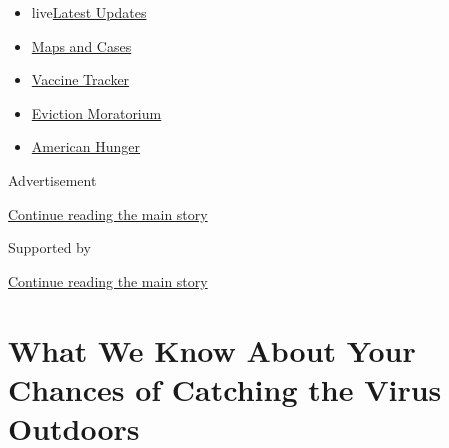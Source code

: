 \begin{itemize}
\tightlist
\item
  live\href{https://www.nytimes3xbfgragh.onion/2020/09/05/world/coronavirus-covid.html?name=styln-coronavirus-national\&region=TOP_BANNER\&block=storyline_menu_recirc\&action=click\&pgtype=Article\&impression_id=38bfd400-efbb-11ea-a941-d3ff0b5fd50c\&variant=undefined}{Latest
  Updates}
\item
  \href{https://www.nytimes3xbfgragh.onion/interactive/2020/us/coronavirus-us-cases.html?name=styln-coronavirus-national\&region=TOP_BANNER\&block=storyline_menu_recirc\&action=click\&pgtype=Article\&impression_id=38bfd401-efbb-11ea-a941-d3ff0b5fd50c\&variant=undefined}{Maps
  and Cases}
\item
  \href{https://www.nytimes3xbfgragh.onion/interactive/2020/science/coronavirus-vaccine-tracker.html?name=styln-coronavirus-national\&region=TOP_BANNER\&block=storyline_menu_recirc\&action=click\&pgtype=Article\&impression_id=38bfd402-efbb-11ea-a941-d3ff0b5fd50c\&variant=undefined}{Vaccine
  Tracker}
\item
  \href{https://www.nytimes3xbfgragh.onion/2020/09/02/your-money/eviction-moratorium-covid.html?name=styln-coronavirus-national\&region=TOP_BANNER\&block=storyline_menu_recirc\&action=click\&pgtype=Article\&impression_id=38bfd403-efbb-11ea-a941-d3ff0b5fd50c\&variant=undefined}{Eviction
  Moratorium}
\item
  \href{https://www.nytimes3xbfgragh.onion/interactive/2020/09/02/magazine/food-insecurity-hunger-us.html?name=styln-coronavirus-national\&region=TOP_BANNER\&block=storyline_menu_recirc\&action=click\&pgtype=Article\&impression_id=38bfd404-efbb-11ea-a941-d3ff0b5fd50c\&variant=undefined}{American
  Hunger}
\end{itemize}

Advertisement

\protect\hyperlink{after-top}{Continue reading the main story}

Supported by

\protect\hyperlink{after-sponsor}{Continue reading the main story}

\hypertarget{what-we-know-about-your-chances-of-catching-the-virus-outdoors}{%
\section{What We Know About Your Chances of Catching the Virus
Outdoors}\label{what-we-know-about-your-chances-of-catching-the-virus-outdoors}}

